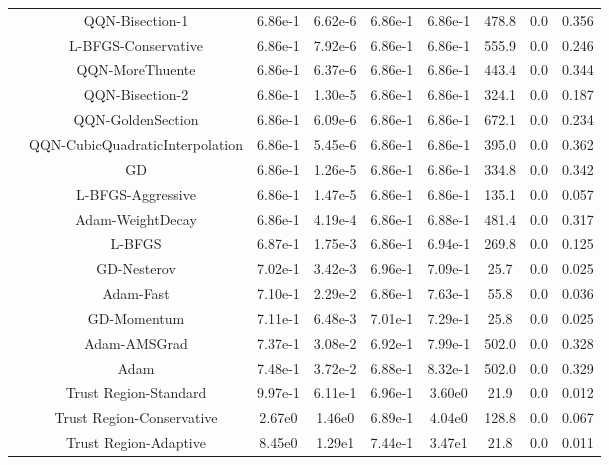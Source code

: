 \documentclass{article}
\begin{document}
{\begin{longtable}{l*{8}{S[table-format=2.2e-1]}}
 & QQN-Bisection-1 & 6.86e-1 & 6.62e-6 & 6.86e-1 & 6.86e-1 & 478.8 & 0.0 & 0.356 \\
 & L-BFGS-Conservative & 6.86e-1 & 7.92e-6 & 6.86e-1 & 6.86e-1 & 555.9 & 0.0 & 0.246 \\
 & QQN-MoreThuente & 6.86e-1 & 6.37e-6 & 6.86e-1 & 6.86e-1 & 443.4 & 0.0 & 0.344 \\
 & QQN-Bisection-2 & 6.86e-1 & 1.30e-5 & 6.86e-1 & 6.86e-1 & 324.1 & 0.0 & 0.187 \\
 & QQN-GoldenSection & 6.86e-1 & 6.09e-6 & 6.86e-1 & 6.86e-1 & 672.1 & 0.0 & 0.234 \\
 & QQN-CubicQuadraticInterpolation & 6.86e-1 & 5.45e-6 & 6.86e-1 & 6.86e-1 & 395.0 & 0.0 & 0.362 \\
 & GD & 6.86e-1 & 1.26e-5 & 6.86e-1 & 6.86e-1 & 334.8 & 0.0 & 0.342 \\
 & L-BFGS-Aggressive & 6.86e-1 & 1.47e-5 & 6.86e-1 & 6.86e-1 & 135.1 & 0.0 & 0.057 \\
 & Adam-WeightDecay & 6.86e-1 & 4.19e-4 & 6.86e-1 & 6.88e-1 & 481.4 & 0.0 & 0.317 \\
 & L-BFGS & 6.87e-1 & 1.75e-3 & 6.86e-1 & 6.94e-1 & 269.8 & 0.0 & 0.125 \\
 & GD-Nesterov & 7.02e-1 & 3.42e-3 & 6.96e-1 & 7.09e-1 & 25.7 & 0.0 & 0.025 \\
 & Adam-Fast & 7.10e-1 & 2.29e-2 & 6.86e-1 & 7.63e-1 & 55.8 & 0.0 & 0.036 \\
 & GD-Momentum & 7.11e-1 & 6.48e-3 & 7.01e-1 & 7.29e-1 & 25.8 & 0.0 & 0.025 \\
 & Adam-AMSGrad & 7.37e-1 & 3.08e-2 & 6.92e-1 & 7.99e-1 & 502.0 & 0.0 & 0.328 \\
 & Adam & 7.48e-1 & 3.72e-2 & 6.88e-1 & 8.32e-1 & 502.0 & 0.0 & 0.329 \\
 & Trust Region-Standard & 9.97e-1 & 6.11e-1 & 6.96e-1 & 3.60e0 & 21.9 & 0.0 & 0.012 \\
 & Trust Region-Conservative & 2.67e0 & 1.46e0 & 6.89e-1 & 4.04e0 & 128.8 & 0.0 & 0.067 \\
 & Trust Region-Adaptive & 8.45e0 & 1.29e1 & 7.44e-1 & 3.47e1 & 21.8 & 0.0 & 0.011 \\
\midrule
\end{longtable}
}
\end{document}
